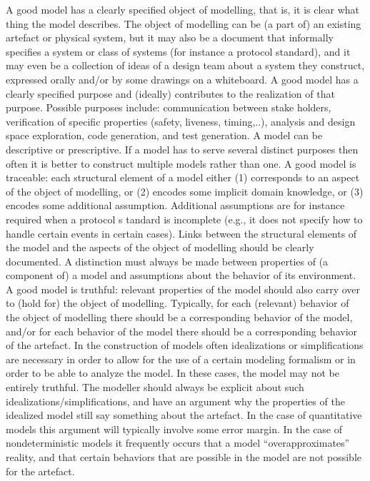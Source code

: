     A good model has a clearly specified object of modelling, that is, it is clear what thing the model describes. The object of modelling can be (a part of) an existing artefact or physical system, but it may also be a document that informally specifies a system or class of systems (for instance a protocol standard), and it may even be a collection of ideas of a design team about a system they construct, expressed orally and/or by some drawings on a whiteboard.
    A good model has a clearly specified purpose and (ideally) contributes to the realization of that purpose. Possible purposes include: communication between stake holders, verification of specific properties (safety, liveness, timing,..), analysis and design space exploration, code generation, and test generation. A model can be descriptive or prescriptive. If a model has to serve several distinct purposes then often it is better to construct multiple models rather than one.
    A good model is traceable: each structural element of a model either (1) corresponds to an aspect of the object of modelling, or (2) encodes some implicit domain knowledge, or (3) encodes some additional assumption. Additional assumptions are for instance required when a protocol s tandard is incomplete (e.g., it does not specify how to handle certain events in certain cases). Links between the structural elements of the model and the aspects of the object of modelling should be clearly documented. A distinction must always be made between properties of (a component of) a model and assumptions about the behavior of its environment.
    A good model is truthful: relevant properties of the model should also carry over to (hold for) the object of modelling. Typically, for each (relevant) behavior of the object of modelling there should be a corresponding behavior of the model, and/or for each behavior of the model there should be a corresponding behavior of the artefact. In the construction of models often idealizations or simplifications are necessary in order to allow for the use of a certain modeling formalism or in order to be able to analyze the model. In these cases, the model may not be entirely truthful. The modeller should always be explicit about such idealizations/simplifications, and have an argument why the properties of the idealized model still say something about the artefact. In the case of quantitative models this argument will typically involve some error margin. In the case of nondeterministic models it frequently occurs that a model ``overapproximates'' reality, and that certain behaviors that are possible in the model are not possible for the artefact.
